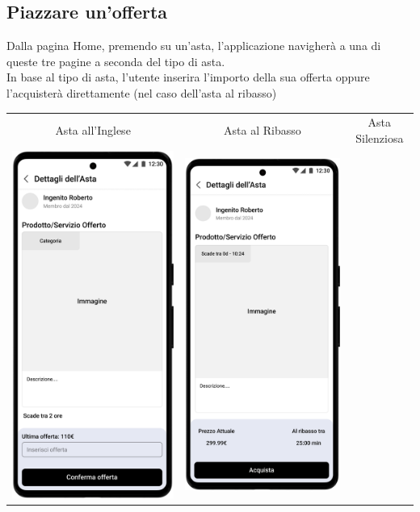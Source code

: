 \newpage
\subsection{Piazzare un'offerta}
Dalla pagina Home, premendo su un'asta, l'applicazione navigherà a una di queste tre pagine a seconda del tipo di asta.\\
In base al tipo di asta, l'utente inserira l'importo della sua offerta oppure l'acquisterà direttamente (nel caso dell'asta al ribasso)

\begin{center}
	\begin{tabular}{ccc}
		Asta all'Inglese                                                                   &
		Asta al Ribasso                                                                    &
		Asta Silenziosa                                                                      \\
		\includegraphics[width=.3\textwidth]{images/mockup/Dettaglio Asta all'Inglese.png} &
		\includegraphics[width=.3\textwidth]{images/mockup/Dettaglio Asta al Ribasso.png}  &

\end{tabular}
\end{center}
